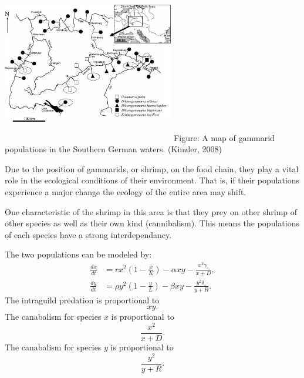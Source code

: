 \documentclass[landscape,final,a0paper,fontscale=0.285]{baposter}
\begin{document}
\begin{poster}
{\begin{center}\includegraphics[width=7.5cm,height=7cm]{img/kinzlermap} 
Figure: A map of gammarid populations in the Southern German waters. (Kinzler, 2008) \end{center}

Due to the position of gammarids, or shrimp, on the food chain, they play a vital role in the ecological conditions of their environment. That is, if their populations experience a major change the ecology of the entire area may shift. 

One characteristic of the shrimp in this area is that they prey on other shrimp of other species as well as their own kind (cannibalism). This means the populations of each species have a strong interdependancy. 

}

{
The two populations can be modeled by:
   \begin{align*}
    \frac{dx}{dt} & = rx^2 \left(1-\frac{x}{K}\right) - \alpha xy - \frac{x^2 \gamma_\circ}{x+D}, \\
    \frac{dy}{dt} & = \rho y^2 \left(1-\frac{y}{L}\right) - \beta xy -\frac{y^2 \delta_\circ}{y+R}.
  \end{align*}
  The intraguild predation is proportional to $$xy.$$
  The canabalism for species $x$ is proportional to $$\frac{x^2}{x+D}.$$
  The canabalism for species $y$ is proportional to $$\frac{y^2}{y+R}.$$ 
	
}


\end{poster}
\end{document}
